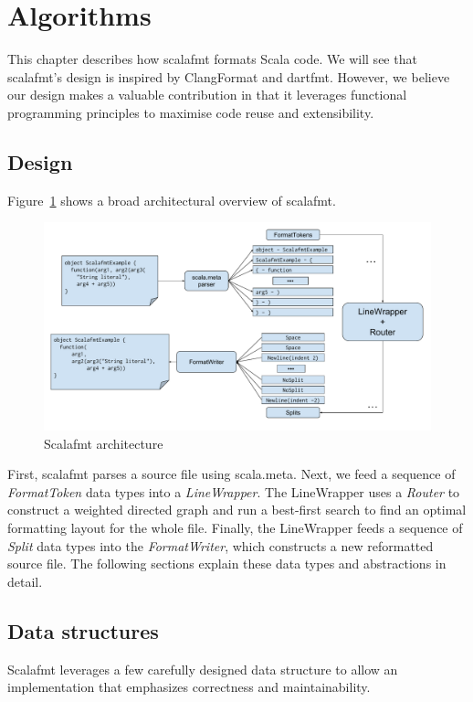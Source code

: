 \section{Algorithms}\label{sec:algorithms}
This chapter describes how scalafmt formats Scala code.
We will see that scalafmt's design is inspired by ClangFormat and dartfmt.
However, we believe our design makes a valuable contribution in that it leverages functional programming principles to maximise code reuse and extensibility.

\subsection{Design}
Figure~\ref{fig:architecture} shows a broad architectural overview of scalafmt.
\begin{figure}
  \centering
  \includegraphics[width=\textwidth]{img/architechture.pdf}
  \caption{Scalafmt architecture}
  \label{fig:architecture}
\end{figure}
First, scalafmt parses a source file using scala.meta.
Next, we feed a sequence of \emph{FormatToken} data types into a \emph{LineWrapper}.
The LineWrapper uses a \emph{Router} to construct a weighted directed graph and run a best-first search to find an optimal formatting layout for the whole file.
Finally, the LineWrapper feeds a sequence of \emph{Split} data types into the \emph{FormatWriter}, which constructs a new reformatted source file.
The following sections explain these data types and abstractions in detail.

\subsection{Data structures}
Scalafmt leverages a few carefully designed data structure to allow an implementation that emphasizes correctness and maintainability.

